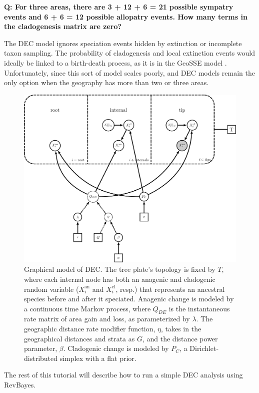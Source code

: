 {\bf Q: For three areas, there are 3 + 12 + 6 = 21 possible sympatry events and 6 + 6 = 12 possible allopatry events. How many terms in the cladogenesis matrix are zero?}

The DEC model ignores speciation events hidden by extinction or incomplete taxon sampling.
The probability of cladogenesis and local extinction events would ideally be linked to a birth-death process, as it is in the GeoSSE model \citep{goldberg11}.
Unfortunately, since this sort of model scales poorly, and DEC models remain the only option when the geography has more than two or three areas.


\begin{figure}[H]
\centering
\includegraphics[width=5in]{figures/bg_dec_dag}
\caption{Graphical model of DEC. The tree plate's topology is fixed by $T$, where each internal node has both an anagenic and cladogenic random variable ($X_i^{\text{an}}$ and $X_i^{\text{cl}}$, resp.) that represents an ancestral species before and after it speciated. Anagenic change is modeled by a continuous time Markov process, where $Q_{DE}$ is the instantaneous rate matrix of area gain and loss, as parameterized by $\lambda$. The geographic distance rate modifier function, $\eta$, takes in the geographical distances and strata as $G$, and the distance power parameter, $\beta$. Cladogenic change is modeled by $P_C$, a Dirichlet-distributed simplex with a flat prior.}
\end{figure}

The rest of this tutorial will describe how to run a simple DEC analysis using RevBayes.

